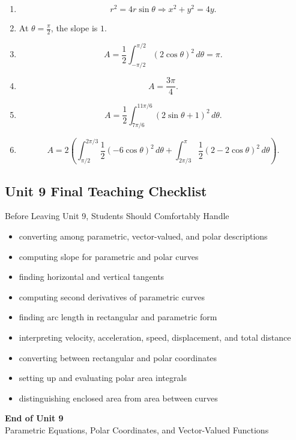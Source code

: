 \documentclass[11pt]{article}
\begin{document}
\begin{enumerate}
    \item
    \[
    r^2=4r\sin\theta \Longrightarrow x^2+y^2=4y.
    \]

    \item At \(\theta=\frac{\pi}{2}\), the slope is \(1\).

    \item
    \[
    A=\frac12\int_{-\pi/2}^{\pi/2}(2\cos\theta)^2\,d\theta=\pi.
    \]

    \item
    \[
    A=\frac{3\pi}{4}.
    \]

    \item
    \[
    A=\frac12\int_{7\pi/6}^{11\pi/6}(2\sin\theta+1)^2\,d\theta.
    \]

    \item
    \[
    A
    =
    2\left(
    \int_{\pi/2}^{2\pi/3}\frac12(-6\cos\theta)^2\,d\theta
    +
    \int_{2\pi/3}^{\pi}\frac12(2-2\cos\theta)^2\,d\theta
    \right).
    \]
\end{enumerate}

\newpage
\subsection{Unit 9 Final Teaching Checklist}

\begin{theorybox}{Before Leaving Unit 9, Students Should Comfortably Handle}
\begin{itemize}
    \item converting among parametric, vector-valued, and polar descriptions
    \item computing slope for parametric and polar curves
    \item finding horizontal and vertical tangents
    \item computing second derivatives of parametric curves
    \item finding arc length in rectangular and parametric form
    \item interpreting velocity, acceleration, speed, displacement, and total distance
    \item converting between rectangular and polar coordinates
    \item setting up and evaluating polar area integrals
    \item distinguishing enclosed area from area between curves
\end{itemize}
\end{theorybox}

\vfill
\begin{center}
{\Large\color{novelPurpleDark}\textbf{End of Unit 9}}\\[0.35em]
{\large Parametric Equations, Polar Coordinates, and Vector-Valued Functions}
\end{center}
\end{document}

